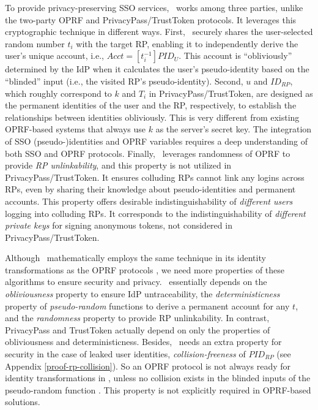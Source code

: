 To provide privacy-preserving SSO services, \usso\ works among three parties, unlike the two-party OPRF and PrivacyPass/TrustToken protocols.
It leverages this cryptographic technique in different ways. %
First, \usso\ securely shares the user-selected random number $t_i$ with the target RP,
enabling it to independently derive the user's unique account, i.e., $Acct = [t_i^{-1}]PID_{U}$. This account is ``obliviously'' determined by the IdP when it calculates the user's pseudo-identity based on the ``blinded'' input (i.e., the visited RP's pseudo-identity). Second, $u$ and $ID_{RP}$, which roughly correspond to $k$ and $T_i$ in PrivacyPass/TrustToken, are designed as the permanent identities of the user and the RP, respectively, to establish the relationships between identities obliviously.
This is very different from existing OPRF-based systems  \cite{privacypass, trusttoken, strong-oprf, oprf-bitcoin-wallet, pesto, oprf-ot-si, pp-ss, Private-Contact-Discovery, o-kms, oprf-deduplication} that always use $k$ as the server's secret key.
The integration of SSO (pseudo-)identities  and OPRF variables requires a deep understanding of both SSO and OPRF protocols.
Finally, \usso\ leverages randomness of OPRF to provide \emph{RP unlinkability}, and this property is not utilized in PrivacyPass/TrustToken.
It ensures colluding RPs cannot link any logins across RPs, %
even by sharing their knowledge about pseudo-identities and permanent accounts.
This property offers desirable indistinguishability of \emph{different users} logging into colluding RPs.
It corresponds to the indistinguishability of \emph{different private keys} for signing anonymous tokens, not considered in PrivacyPass/TrustToken. 

Although \usso\ mathematically employs the same technique in its identity transformations as the OPRF protocols \cite{oprf-proved,voprf-proved}, we need more properties of these algorithms to ensure security and privacy. %
\usso\ essentially depends on the \emph{obliviousness} property to ensure IdP untraceability, 
the \emph{deterministicness} property of \emph{pseudo-random} functions to derive a permanent account for any $t$, and the \emph{randomness} property to provide RP unlinkability. 
In contrast, PrivacyPass and TrustToken \cite{privacypass,trusttoken} actually depend on only the properties of obliviousness and deterministicness.
Besides, \usso\ needs an extra property for security in the case of leaked user identities,
     \emph{collision-freeness} of $PID_{RP}$ (see Appendix \ref{proof-rp-collision}).
So an OPRF protocol is not always ready for identity transformations in \usso, unless no collision exists in the blinded inputs of the pseudo-random function \cite{oprf-proved,voprf-proved}.
This property is not explicitly required in OPRF-based solutions.

